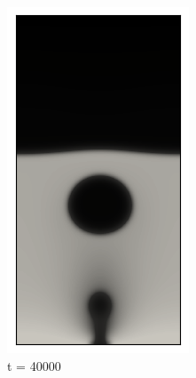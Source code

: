 \begin{figure}[h!]
	\medskip
	\begin{subfigure}{0.25\textwidth}
		\includegraphics[width=\linewidth]{figs/cap4/bubble_40}
		\caption{t = 40000}
		\label{fig:7}
	\end{subfigure}\hfil %
	\begin{subfigure}{0.25\textwidth}

\end{subfigure}
\end{figure}
